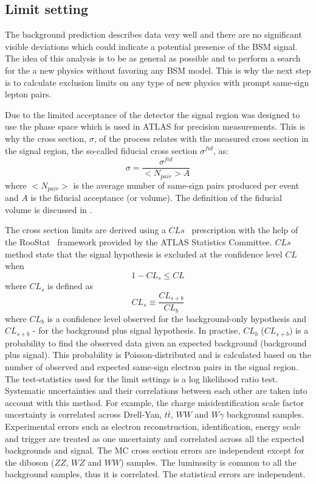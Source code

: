 \subsection{Limit setting}

The background prediction describes data very well and there are no significant visible deviations which could indicate a potential presence of the BSM signal.
The idea of this analysis is to be as general as possible and to perform a search for the a new physics without favoring any BSM model.
This is why the next step is to calculate exclusion limits on any type of new physics with prompt same-sign lepton pairs.

Due to the limited acceptance of the detector the signal region was designed to use the phase space which is used in ATLAS for precision measurements.
This is why the cross section, $\sigma$, of the process relates with the measured cross section in the signal region, the so-called fiducial cross section $\sigma^{fid}$, as:
\begin{equation}
 \sigma = \dfrac{\sigma^{fid}}{<N_{pair}>A}
 \label{eq:cross_section}
\end{equation}
where $<N_{pair}>$ is the average number of same-sign pairs produced per event and $A$ is the fiducial acceptance (or volume).
The definition of the fiducial volume is discussed in .

The cross section limits are derived using a $CLs$~\cite{CLs_tecnique,CLs_2} prescription with the help of the RooStat~\cite{RooStat_project} framework 
provided by the ATLAS Statistics Committee. $CLs$ method state that the signal hypothesis is excluded at the confidence level $CL$ when
\begin{equation}
 1 - CL_s \leq CL
\end{equation}
where $CL_s$ is defined as
\begin{equation}
 CL_s \equiv \dfrac{CL_{s+b}}{CL_b}
\end{equation}
where $CL_b$ is a confidence level observed for the background-only hypothesis and $CL_{s+b}$ - for the background plus signal hypothesis.
In practise, $CL_b$ ($CL_{s+b}$) is a probability to find the observed data given an expected background (background plus signal).
This probability is Poisson-distributed and is calculated based on the number of observed and expected same-sign electron pairs in the signal region.
The test-statistics used for the limit settings is a log likelihood ratio test.
Systematic uncertainties and their correlations between each other are taken into account with this method.
For example, the charge misidentification scale factor uncertainty is correlated across Drell-Yan, $t\bar{t}$, $WW$ and $W\gamma$ background samples.
Experimental errors such as electron reconstruction, identification, energy scale and trigger 
are treated as one uncertainty and correlated across all the expected backgrounds and signal.
The MC cross section errors are independent except for the diboson ($ZZ$, $WZ$ and $WW$) samples.
The luminosity is common to all the background samples, thus it is correlated.
The statistical errors are independent.

